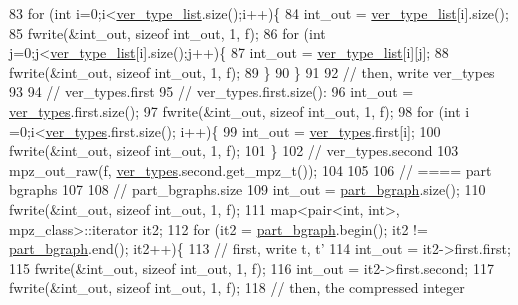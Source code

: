 \begin{DoxyCode}
83   \textcolor{keywordflow}{for} (\textcolor{keywordtype}{int} i=0;i<\hyperlink{classmarked__graph__compressed_af2e3e55223d436628a02758dfae88493}{ver\_type\_list}.size();i++)\{
84     int\_out = \hyperlink{classmarked__graph__compressed_af2e3e55223d436628a02758dfae88493}{ver\_type\_list}[i].size();
85     fwrite(&int\_out, \textcolor{keyword}{sizeof} int\_out, 1, f);
86     \textcolor{keywordflow}{for} (\textcolor{keywordtype}{int} j=0;j<\hyperlink{classmarked__graph__compressed_af2e3e55223d436628a02758dfae88493}{ver\_type\_list}[i].size();j++)\{
87       int\_out = \hyperlink{classmarked__graph__compressed_af2e3e55223d436628a02758dfae88493}{ver\_type\_list}[i][j];
88       fwrite(&int\_out, \textcolor{keyword}{sizeof} int\_out, 1, f);
89     \}
90   \}
91 
92   \textcolor{comment}{// then, write ver\_types}
93 
94   \textcolor{comment}{// ver\_types.first}
95   \textcolor{comment}{// ver\_types.first.size():}
96   int\_out = \hyperlink{classmarked__graph__compressed_af446cc5e23c241a92b76642fd5ebc403}{ver\_types}.first.size();
97   fwrite(&int\_out, \textcolor{keyword}{sizeof} int\_out, 1, f);
98   \textcolor{keywordflow}{for} (\textcolor{keywordtype}{int} i =0;i<\hyperlink{classmarked__graph__compressed_af446cc5e23c241a92b76642fd5ebc403}{ver\_types}.first.size(); i++)\{
99     int\_out = \hyperlink{classmarked__graph__compressed_af446cc5e23c241a92b76642fd5ebc403}{ver\_types}.first[i];
100     fwrite(&int\_out, \textcolor{keyword}{sizeof} int\_out, 1, f);
101   \}
102   \textcolor{comment}{// ver\_types.second}
103   mpz\_out\_raw(f, \hyperlink{classmarked__graph__compressed_af446cc5e23c241a92b76642fd5ebc403}{ver\_types}.second.get\_mpz\_t());
104 
105 
106   \textcolor{comment}{// ==== part bgraphs}
107 
108   \textcolor{comment}{// part\_bgraphs.size}
109   int\_out = \hyperlink{classmarked__graph__compressed_a7b3267063fba30b45eb21b3ba4e07536}{part\_bgraph}.size();
110   fwrite(&int\_out, \textcolor{keyword}{sizeof} int\_out, 1, f);
111   map<pair<int, int>, mpz\_class>::iterator it2;
112   \textcolor{keywordflow}{for} (it2 = \hyperlink{classmarked__graph__compressed_a7b3267063fba30b45eb21b3ba4e07536}{part\_bgraph}.begin(); it2 != \hyperlink{classmarked__graph__compressed_a7b3267063fba30b45eb21b3ba4e07536}{part\_bgraph}.end(); it2++)\{
113     \textcolor{comment}{// first, write t, t'}
114     int\_out = it2->first.first;
115     fwrite(&int\_out, \textcolor{keyword}{sizeof} int\_out, 1, f);
116     int\_out = it2->first.second;
117     fwrite(&int\_out, \textcolor{keyword}{sizeof} int\_out, 1, f);
118     \textcolor{comment}{// then, the compressed integer}

\end{DoxyCode}
